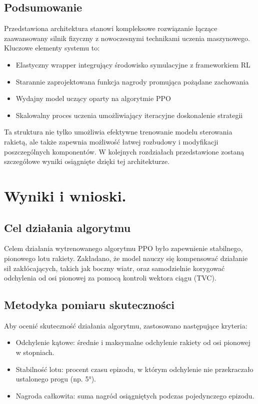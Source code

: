 \subsection{Podsumowanie}
\label{subsec:podsumowanie}

Przedstawiona architektura stanowi kompleksowe rozwiązanie łączące zaawansowany silnik fizyczny z nowoczesnymi technikami uczenia maszynowego. Kluczowe elementy systemu to:

\begin{itemize}
    \item Elastyczny wrapper integrujący środowisko symulacyjne z frameworkiem RL
    \item Starannie zaprojektowana funkcja nagrody promująca pożądane zachowania
    \item Wydajny model uczący oparty na algorytmie PPO
    \item Skalowalny proces uczenia umożliwiający iteracyjne doskonalenie strategii
\end{itemize}

Ta struktura nie tylko umożliwia efektywne trenowanie modelu sterowania
rakietą, ale także zapewnia możliwość łatwej rozbudowy i modyfikacji poszczególnych komponentów. W kolejnych rozdziałach przedstawione zostaną szczegółowe wyniki osiągnięte dzięki tej architekturze.




\section{Wyniki i wnioski.}

\subsection{Cel działania algorytmu}

Celem działania wytrenowanego algorytmu PPO było zapewnienie stabilnego, pionowego lotu rakiety. Zakładano, że model nauczy się kompensować działanie sił zakłócających,
takich jak boczny wiatr, oraz samodzielnie korygować odchylenia od osi pionowej za pomocą kontroli wektora ciągu (TVC).

\subsection{Metodyka pomiaru skuteczności}
Aby ocenić skuteczność działania algorytmu, zastosowano następujące kryteria:

\begin{itemize}
    \item Odchylenie kątowe: średnie i maksymalne odchylenie rakiety od osi pionowej w stopniach.
    \item Stabilność lotu: procent czasu epizodu, w którym odchylenie nie przekraczało ustalonego progu (np. 5°).
    \item Nagroda całkowita: suma nagród osiągniętych podczas pojedynczego epizodu.
\end{itemize}

